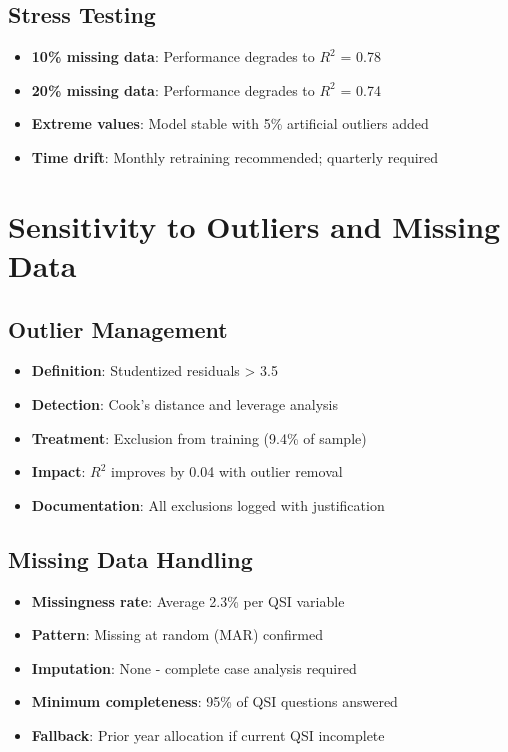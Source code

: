 \subsection{Stress Testing}

\begin{itemize}
    \item \textbf{10\% missing data}: Performance degrades to $R^2$ = 0.78
    \item \textbf{20\% missing data}: Performance degrades to $R^2$ = 0.74
    \item \textbf{Extreme values}: Model stable with 5\% artificial outliers added
    \item \textbf{Time drift}: Monthly retraining recommended; quarterly required
\end{itemize}

\section{Sensitivity to Outliers and Missing Data}

\subsection{Outlier Management}

\begin{itemize}
    \item \textbf{Definition}: Studentized residuals > 3.5
    \item \textbf{Detection}: Cook's distance and leverage analysis
    \item \textbf{Treatment}: Exclusion from training (9.4\% of sample)
    \item \textbf{Impact}: $R^2$ improves by 0.04 with outlier removal
    \item \textbf{Documentation}: All exclusions logged with justification
\end{itemize}

\subsection{Missing Data Handling}

\begin{itemize}
    \item \textbf{Missingness rate}: Average 2.3\% per QSI variable
    \item \textbf{Pattern}: Missing at random (MAR) confirmed
    \item \textbf{Imputation}: None - complete case analysis required
    \item \textbf{Minimum completeness}: 95\% of QSI questions answered
    \item \textbf{Fallback}: Prior year allocation if current QSI incomplete
\end{itemize}

